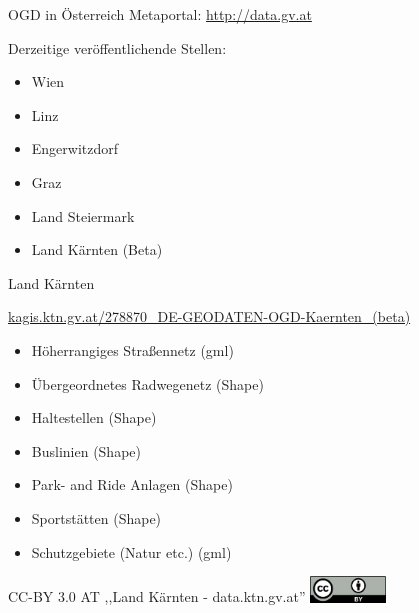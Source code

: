\documentclass{beamer}
\begin{document}
\begin{frame}{OGD in Österreich}
	Metaportal: \url{http://data.gv.at}

	\vspace{3mm}

	Derzeitige veröffentlichende Stellen:
	\begin{itemize}
		\item Wien
		\item Linz
		\item Engerwitzdorf
		\item Graz
		\item Land Steiermark
			\pause
		\item Land Kärnten (Beta)
	\end{itemize}
\end{frame}

\begin{frame}{Land Kärnten}
	
	\href{http://www.kagis.ktn.gv.at/278870\_DE-GEODATEN-OGD-Kaernten\_(beta)}{kagis.ktn.gv.at/278870\_DE-GEODATEN-OGD-Kaernten\_(beta)}
	\begin{itemize}
		\item Höherrangiges Straßennetz (gml)
		\item Übergeordnetes Radwegenetz (Shape)
		\item Haltestellen (Shape)
		\item Buslinien (Shape)
		\item Park- and Ride Anlagen (Shape)
		\item Sportstätten (Shape)
		\item Schutzgebiete (Natur etc.) (gml)
	\end{itemize}
	\vspace{3mm}
	CC-BY 3.0 AT ,,Land Kärnten - data.ktn.gv.at'' \hfill \includegraphics[width=2cm]{cc-by.png}
\end{frame}
\end{document}
